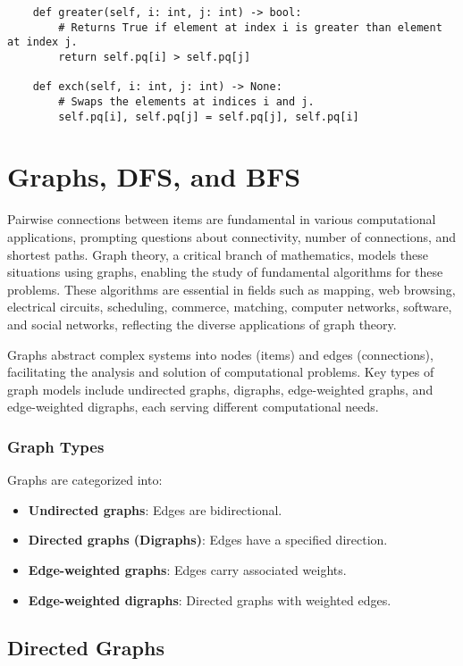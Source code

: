 \documentclass{article}
\begin{document}
\begin{verbatim}
    def greater(self, i: int, j: int) -> bool:
        # Returns True if element at index i is greater than element at index j.
        return self.pq[i] > self.pq[j]

    def exch(self, i: int, j: int) -> None:
        # Swaps the elements at indices i and j.
        self.pq[i], self.pq[j] = self.pq[j], self.pq[i]
\end{verbatim}

\section{Graphs, DFS, and BFS}

Pairwise connections between items are fundamental in various computational applications, prompting questions about connectivity, number of connections, and shortest paths. Graph theory, a critical branch of mathematics, models these situations using graphs, enabling the study of fundamental algorithms for these problems. These algorithms are essential in fields such as mapping, web browsing, electrical circuits, scheduling, commerce, matching, computer networks, software, and social networks, reflecting the diverse applications of graph theory.

Graphs abstract complex systems into nodes (items) and edges (connections), facilitating the analysis and solution of computational problems. Key types of graph models include undirected graphs, digraphs, edge-weighted graphs, and edge-weighted digraphs, each serving different computational needs.

\subsubsection{Graph Types}
Graphs are categorized into:
\begin{itemize}
    \item \textbf{Undirected graphs}: Edges are bidirectional.
    \item \textbf{Directed graphs (Digraphs)}: Edges have a specified direction.
    \item \textbf{Edge-weighted graphs}: Edges carry associated weights.
    \item \textbf{Edge-weighted digraphs}: Directed graphs with weighted edges.
\end{itemize}

\subsection{Directed Graphs}
\end{document}
